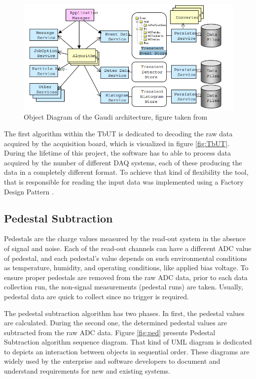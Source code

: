 \begin{figure}[h]
\centering
\includegraphics{figures/Gaudi.png}
\caption{Object Diagram of the Gaudi architecture, figure taken from \cite{gaudi} }
\label{fig:gaudi flow}
\end{figure}


The first algorithm within the TbUT is dedicated to decoding the raw data acquired by the acquisition board, which is visualized in figure \ref{fig:TbUT}.  
During the lifetime of this project, the software has to able to process data acquired by the number of different DAQ systems, each of these producing the data in a completely different format.  To achieve that kind of flexibility the tool, that is responsible for reading the input data was implemented using a Factory Design Pattern \cite{DesignPatterns}. 

\subsection{Pedestal Subtraction}

Pedestals are the charge values measured by the read-out system in the absence of signal and noise. Each of the read-out channels can have a different ADC value of pedestal, and each pedestal's value depends on such environmental conditions as temperature, humidity, and operating conditions, like applied bias voltage. 
To ensure proper pedestals are removed from the raw ADC data, prior to each data collection run, the non-signal measurements (pedestal runs) are taken. Usually, pedestal data are quick to collect since no trigger is required. 

The pedestal subtraction algorithm has two phases. In first, the pedestal values are calculated. During the second one, the determined pedestal values are subtracted from the raw ADC data. Figure \ref{fig:ped} presents Pedestal Subtraction algorithm sequence diagram. That kind of UML diagram \cite{UML} is dedicated to depicts an interaction between objects in sequential order. These diagrams are widely used by the enterprise and software developers to document and understand requirements for new and existing systems. 

